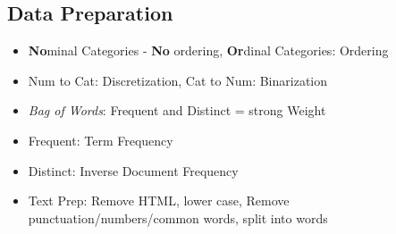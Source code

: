\documentclass[english]{latex4ei/latex4ei_sheet}
\begin{document}
\begin{sectionbox}
\subsection{Data Preparation}
\begin{itemize}
    \item \textbf{No}minal Categories - \textbf{No} ordering, \textbf{Or}dinal Categories: Ordering
    \item Num to Cat: Discretization, Cat to Num: Binarization
    \item \emph{Bag of Words}: Frequent and Distinct = strong Weight
    \item Frequent: Term Frequency
    \item Distinct: Inverse Document Frequency
    \item Text Prep: Remove HTML, lower case, Remove punctuation/numbers/common words, split into words
\end{itemize}
\end{sectionbox}
\end{document}
